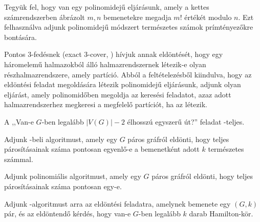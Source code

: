 
\begin{Exercise}[counter={sorszam}, difficulty=0]
 Tegyük fel, hogy van egy polinomidejű eljárásunk, amely a kettes számrendszerben ábrázolt $m,n$ bemenetekre megadja $m!$ értékét modulo $n$. Ezt felhasználva adjunk polinomidejű módszert természetes számok prímtényezőkre bontására.
\end{Exercise}


\begin{Exercise}[counter={sorszam}, difficulty=-1]
 Pontos 3-fedésnek (exact 3-cover, ) hívjuk annak eldöntését, hogy egy háromelemű halmazokból álló halmazrendszernek létezik-e olyan részhalmazrendszere, amely partíció. Abból a feltételezésből kiindulva, hogy az  eldöntési feladat megoldására létezik polinomidejű eljárásunk, adjunk olyan eljárást, amely polinomidőben megoldja az  keresési feladatot, azaz adott halmazrendszerhez megkeresi a megfelelő partíciót, ha az létezik.
\end{Exercise}


\begin{Exercise}[counter={sorszam}, difficulty=0]
 A ,,Van-e $G$-ben legalább $|V(G)|-2$ élhosszú egyszerű út?'' feladat \NP-teljes.
\end{Exercise}


\begin{Exercise}[counter={sorszam}, difficulty=0]
 Adjunk \PSPACE-beli algoritmust, amely egy $G$ páros gráfról eldönti, hogy teljes párosításainak száma pontosan egyenlő-e a bemenetként adott $k$ természetes számmal.
\end{Exercise}


\begin{Exercise}[counter={sorszam}, difficulty=0]
 Adjunk polinomiális algoritmust, amely egy $G$ páros gráfról eldönti, hogy teljes párosításainak száma pontosan egy-e.
\end{Exercise}


\begin{Exercise}[counter={sorszam}, difficulty=0]
 Adjunk \PSPACE-algoritmust arra az eldöntési feladatra, amelynek bemenete egy $(G,k)$ pár, és az eldöntendő kérdés, hogy van-e $G$-ben legalább $k$ darab Hamilton-kör.
\end{Exercise}


